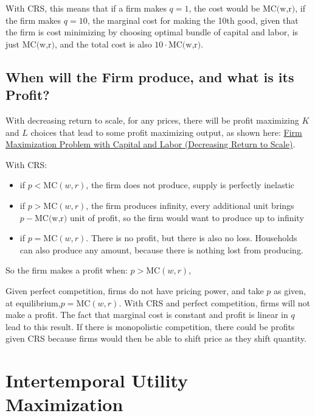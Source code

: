 \documentclass[
]{book}
\begin{document}
With CRS, this means that if a firm makes \(q=1\), the cost would be
\(\textrm{MC(w,r)}\), if the firm makes \(q=10\), the marginal cost for
making the 10th good, given that the firm is cost minimizing by choosing
optimal bundle of capital and labor, is just \(\textrm{MC(w,r)}\), and the
total cost is also \(10\cdot \textrm{MC(w,r)}\).

\hypertarget{when-will-the-firm-produce-and-what-is-its-profit}{%
\subsection{When will the Firm produce, and what is its Profit?}\label{when-will-the-firm-produce-and-what-is-its-profit}}

With decreasing return to scale, for any prices, there will be profit
maximizing \(K\) and \(L\) choices that lead to some profit maximizing
output, as shown here: \href{https://math4econ.github.io/matrix_application/KL_borrowhire_firm.html}{Firm Maximization Problem with Capital and Labor
(Decreasing Return to
Scale)}.

With CRS:

\begin{itemize}
\item
  if \(p<\textrm{MC}(w,r)\), the firm does not produce, supply is
  perfectly inelastic
\item
  if \(p>\textrm{MC}(w,r)\), the firm produces infinity, every
  additional unit brings \(p-\textrm{MC(w,r)}\) unit of profit, so the
  firm would want to produce up to infinity
\item
  if \(p=\textrm{MC}(w,r)\). There is no profit, but there is also no
  loss. Households can also produce any amount, because there is
  nothing lost from producing.
\end{itemize}

So the firm makes a profit when: \(p>\textrm{MC}(w,r)\),

Given perfect competition, firms do not have pricing power, and take \(p\)
as given, at equilibrium,\(p=\textrm{MC}(w,r)\). With CRS and perfect
competition, firms will not make a profit. The fact that marginal cost
is constant and profit is linear in \(q\) lead to this result. If there is
monopolistic competition, there could be profits given CRS because firms
would then be able to shift price as they shift quantity.

\hypertarget{intertemporal-utility-maximization}{%
\section{Intertemporal Utility Maximization}\label{intertemporal-utility-maximization}}
\end{document}
